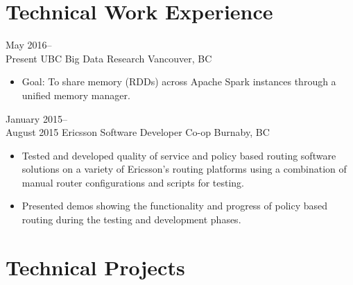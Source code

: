 \documentclass[]{friggeri-cv} %
\begin{document}
\section{Technical Work Experience}

\begin{entrylist}

\entry
{May 2016--\\Present}
{UBC {\normalfont Big Data Research}}
{Vancouver, BC}
{
\begin{itemize}
\item Goal: To share memory (RDDs) across Apache Spark instances through a
unified memory manager.
\end{itemize}
}
\entry
{January 2015--\\August 2015}
{Ericsson {\normalfont Software Developer Co-op}}
{Burnaby, BC}
{
\begin{itemize}
\item Tested and developed quality of service and policy based routing software
  solutions on a variety of Ericsson's routing platforms using a combination of manual
  router configurations and scripts for testing.
\item Presented demos showing the functionality and progress of policy based
  routing during the testing and development phases.
\end{itemize}
}
\end{entrylist}

\section{Technical Projects}
\end{document}
